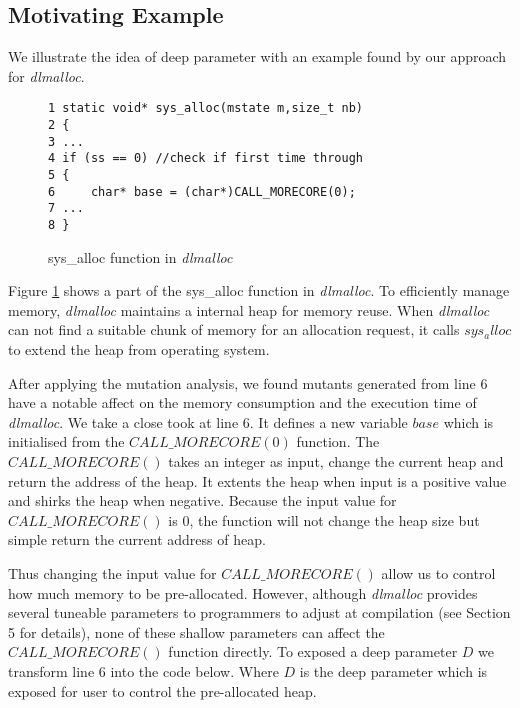 
\subsection{Motivating Example}

We illustrate the idea of deep parameter with an example found by our approach for \emph{dlmalloc}.

\begin{figure}[ht]
\begin{lstlisting}
1 static void* sys_alloc(mstate m,size_t nb) 
2 {
3 ...
4 if (ss == 0) //check if first time through
5 { 
6     char* base = (char*)CALL_MORECORE(0);
7 ...
8 }

\end{lstlisting}
\label{exp}
\caption{sys\_alloc function in \emph{dlmalloc}}
\end{figure}

Figure \ref{exp} shows a part of the sys\_alloc function in \emph{dlmalloc}. To efficiently manage memory, \emph{dlmalloc} maintains a internal heap for memory reuse. When \emph{dlmalloc} can not find a suitable chunk of memory for an allocation request, it calls $sys_alloc$ to extend the heap from operating system.

After applying the mutation analysis, we found mutants generated from line 6 have a notable affect on the memory consumption and the execution time of \emph{dlmalloc}. We take a close took at line 6. It defines a new variable $base$ which is initialised from the $CALL\_MORECORE(0)$ function. The $CALL\_MORECORE()$ takes an integer as input, change the current heap and return the address of the heap. It extents the heap when input is a positive value and shirks the heap when negative. Because the input value for $CALL\_MORECORE()$ is $0$, the function will not change the heap size but simple return the current address of heap.  

Thus changing the input value for $CALL\_MORECORE()$ allow us to control how much memory to be pre-allocated. However, although \emph{dlmalloc} provides several tuneable parameters to programmers to adjust at compilation (see Section 5 for details), none of these shallow parameters can affect the $CALL\_MORECORE()$ function directly. To exposed a deep parameter $D$ we transform line 6 into the code below. Where $D$ is the deep parameter which is exposed for user to control the pre-allocated heap.

